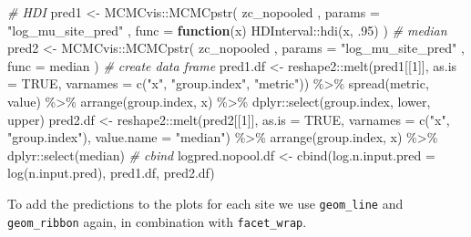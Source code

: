 \documentclass[
]{article}
\newenvironment{Shaded}{\begin{snugshade}}{\end{snugshade}}
\newcommand{\AttributeTok}[1]{\textcolor[rgb]{0.77,0.63,0.00}{#1}}
\newcommand{\CommentTok}[1]{\textcolor[rgb]{0.56,0.35,0.01}{\textit{#1}}}
\newcommand{\ConstantTok}[1]{\textcolor[rgb]{0.00,0.00,0.00}{#1}}
\newcommand{\ControlFlowTok}[1]{\textcolor[rgb]{0.13,0.29,0.53}{\textbf{#1}}}
\newcommand{\DecValTok}[1]{\textcolor[rgb]{0.00,0.00,0.81}{#1}}
\newcommand{\FunctionTok}[1]{\textcolor[rgb]{0.00,0.00,0.00}{#1}}
\newcommand{\NormalTok}[1]{#1}
\newcommand{\OtherTok}[1]{\textcolor[rgb]{0.56,0.35,0.01}{#1}}
\newcommand{\SpecialCharTok}[1]{\textcolor[rgb]{0.00,0.00,0.00}{#1}}
\newcommand{\StringTok}[1]{\textcolor[rgb]{0.31,0.60,0.02}{#1}}
\begin{document}
\begin{Shaded}
\begin{Highlighting}[]
\CommentTok{\# HDI}
\NormalTok{pred1 }\OtherTok{\textless{}{-}}\NormalTok{ MCMCvis}\SpecialCharTok{::}\FunctionTok{MCMCpstr}\NormalTok{(}
\NormalTok{  zc\_nopooled}
\NormalTok{  , }\AttributeTok{params =} \StringTok{"log\_mu\_site\_pred"}
\NormalTok{  , }\AttributeTok{func =} \ControlFlowTok{function}\NormalTok{(x) HDInterval}\SpecialCharTok{::}\FunctionTok{hdi}\NormalTok{(x, .}\DecValTok{95}\NormalTok{)}
\NormalTok{)}
\CommentTok{\# median}
\NormalTok{pred2 }\OtherTok{\textless{}{-}}\NormalTok{ MCMCvis}\SpecialCharTok{::}\FunctionTok{MCMCpstr}\NormalTok{(}
\NormalTok{  zc\_nopooled}
\NormalTok{  , }\AttributeTok{params =} \StringTok{"log\_mu\_site\_pred"}
\NormalTok{  , }\AttributeTok{func =}\NormalTok{ median}
\NormalTok{)}
\CommentTok{\# create data frame}
\NormalTok{pred1.df }\OtherTok{\textless{}{-}}\NormalTok{ reshape2}\SpecialCharTok{::}\FunctionTok{melt}\NormalTok{(pred1[[}\DecValTok{1}\NormalTok{]], }\AttributeTok{as.is =} \ConstantTok{TRUE}\NormalTok{, }\AttributeTok{varnames =} \FunctionTok{c}\NormalTok{(}\StringTok{"x"}\NormalTok{, }\StringTok{"group.index"}\NormalTok{, }\StringTok{"metric"}\NormalTok{)) }\SpecialCharTok{\%\textgreater{}\%} 
  \FunctionTok{spread}\NormalTok{(metric, value) }\SpecialCharTok{\%\textgreater{}\%}
  \FunctionTok{arrange}\NormalTok{(group.index, x) }\SpecialCharTok{\%\textgreater{}\%}
\NormalTok{  dplyr}\SpecialCharTok{::}\FunctionTok{select}\NormalTok{(group.index, lower, upper)}
\NormalTok{pred2.df }\OtherTok{\textless{}{-}}\NormalTok{ reshape2}\SpecialCharTok{::}\FunctionTok{melt}\NormalTok{(pred2[[}\DecValTok{1}\NormalTok{]], }\AttributeTok{as.is =} \ConstantTok{TRUE}\NormalTok{, }\AttributeTok{varnames =} \FunctionTok{c}\NormalTok{(}\StringTok{"x"}\NormalTok{, }\StringTok{"group.index"}\NormalTok{), }\AttributeTok{value.name =} \StringTok{"median"}\NormalTok{) }\SpecialCharTok{\%\textgreater{}\%}
  \FunctionTok{arrange}\NormalTok{(group.index, x) }\SpecialCharTok{\%\textgreater{}\%} 
\NormalTok{  dplyr}\SpecialCharTok{::}\FunctionTok{select}\NormalTok{(median)}
\CommentTok{\# cbind}
\NormalTok{logpred.nopool.df }\OtherTok{\textless{}{-}} \FunctionTok{cbind}\NormalTok{(}\AttributeTok{log.n.input.pred =} \FunctionTok{log}\NormalTok{(n.input.pred), pred1.df, pred2.df)}
\end{Highlighting}
\end{Shaded}

To add the predictions to the plots for each site we use
\texttt{geom\_line} and \texttt{geom\_ribbon} again, in combination with
\texttt{facet\_wrap}.
\end{document}

